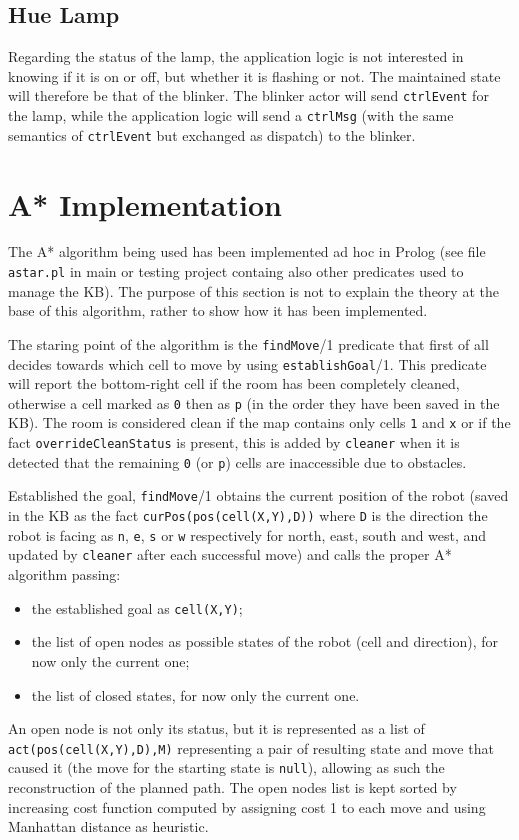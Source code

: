 \subsection{Hue Lamp}
Regarding the status of the lamp, the application logic is not interested in knowing if it is on or off, but whether it is flashing or not. The maintained state will therefore be that of the blinker. The blinker actor will send \texttt{ctrlEvent} for the lamp, while the application logic will send a \texttt{ctrlMsg} (with the same semantics of \texttt{ctrlEvent} but exchanged as dispatch) to the blinker.

\section{A* Implementation}\label{prt:astar_prolog}
The A* algorithm being used has been implemented ad hoc in Prolog (see file \texttt{astar.pl} in main or testing project containg also other predicates used to manage the KB). The purpose of this section is not to explain the theory at the base of this algorithm, rather to show how it has been implemented.

The staring point of the algorithm is the \texttt{findMove}/1 predicate that first of all decides towards which cell to move by using \texttt{establishGoal}/1. This predicate will report the bottom-right cell if the room has been completely cleaned, otherwise a cell marked as \texttt{0} then as \texttt{p} (in the order they have been saved in the KB).
The room is considered clean if the map contains only cells \texttt{1} and \texttt{x} or if the fact \texttt{overrideCleanStatus} is present, this is added by \texttt{cleaner} when it is detected that the remaining \texttt{0} (or \texttt{p}) cells are inaccessible due to obstacles.

Established the goal, \texttt{findMove}/1 obtains the current position of the robot (saved in the KB as the fact \texttt{curPos(pos(cell(X,Y),D))} where \texttt{D} is the direction the robot is facing as \texttt{n}, \texttt{e}, \texttt{s} or \texttt{w} respectively for north, east, south and west, and updated by \texttt{cleaner} after each successful move) and calls the proper A* algorithm passing:
\begin{itemize}
	\item the established goal as \texttt{cell(X,Y)};
	\item the list of open nodes as possible states of the robot (cell and direction), for now only the current one;
	\item the list of closed states, for now only the current one.
\end{itemize}
An open node is not only its status, but it is represented as a list of \texttt{act(pos(cell(X,Y),D),M)} representing a pair of resulting state and move that caused it (the move for the starting state is \texttt{null}), allowing as such the reconstruction of the planned path. The open nodes list is kept sorted by increasing cost function computed by assigning cost 1 to each move and using Manhattan distance as heuristic.

